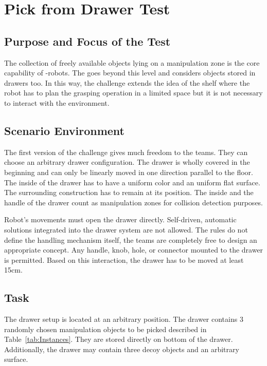 \newpage
\section{Pick from Drawer Test}




\subsection{Purpose and Focus of the Test}
The collection of freely available objects lying on a manipulation zone is the core capability of \RCAW-robots. The  goes beyond this level and considers objects stored in drawers too. In this way, the challenge
extends the idea of the shelf where the robot has to plan the grasping operation in a limited space but it is not necessary to interact with the environment.

\subsection{Scenario Environment}
The first version of the challenge gives much freedom to the teams. They can choose an arbitrary drawer configuration. The drawer is wholly covered in the beginning and can only be linearly moved in one direction parallel to the floor. The inside of the drawer has to have a uniform color and an uniform flat surface. The surrounding construction has to remain at its position. The inside and the handle of the drawer count as manipulation zones for collision detection purposes.

\par
Robot's movements must open the drawer directly. Self-driven, automatic solutions integrated into the drawer system are not allowed.
The rules do not define the handling mechanism itself, the teams are completely free to design an appropriate concept. Any handle, knob, hole, or connector mounted to the drawer is permitted. Based on this interaction, the drawer has to be moved at least 15cm. 

\subsection{Task}
The drawer setup is located at an arbitrary position. The drawer contains 3 randomly chosen manipulation objects to be picked described in Table~\ref{tab:Instances}. They are stored directly on bottom of the drawer. Additionally, the drawer may contain three decoy objects and an arbitrary surface. 

